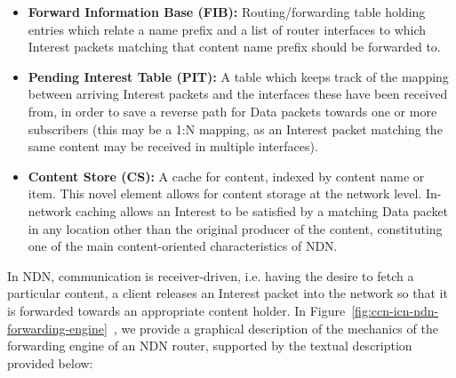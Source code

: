 \begin{itemize}

    \item \textbf{Forward Information Base (FIB):} Routing\slash forwarding 
        table holding entries 
        which relate a name prefix and a list of router interfaces to which 
        Interest packets matching that content name prefix should be forwarded 
        to.
    \item \textbf{Pending Interest Table (PIT):} A table which keeps track of 
        the mapping between arriving Interest packets and 
        the interfaces these have been received from, in order to save a reverse 
        path for Data packets 
        towards one or more subscribers (this may be a 1:N mapping, as an 
        Interest packet matching the same content may be received in 
        multiple interfaces).
    \item \textbf{Content Store (CS):} A cache for content, indexed by content 
        name or item. This novel element allows for content storage at the 
        network level. In-network caching allows an Interest to be satisfied 
        by a matching Data packet in any location other than the original 
        producer of the content, constituting one of the main 
        content-oriented characteristics of NDN.

\end{itemize}

In NDN, communication is receiver-driven, i.e. having the desire to fetch 
a particular content, a client releases an Interest packet into the network 
so that it is forwarded towards an appropriate content holder. In 
Figure~\ref{fig:ccn-icn-ndn-forwarding-engine}~\cite{Yi2012}, we provide a 
graphical description 
of the mechanics of the forwarding engine of an NDN router, supported by 
the textual description provided below:

